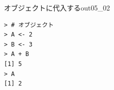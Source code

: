 \begin{Rscreen}{オブジェクトに代入する}{out05_02}
	\begin{verbatim}
> # オブジェクト
> A <- 2
> B <- 3
> A + B
[1] 5
> A 
[1] 2
\end{verbatim}
\end{Rscreen}
